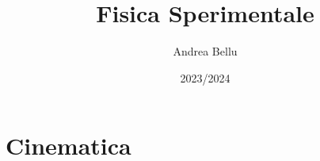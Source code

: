 \documentclass{article}
\title{Fisica Sperimentale}
\author{Andrea Bellu}
\date{2023/2024}
\begin{document}
\maketitle

\tableofcontents
\newpage

\section{Cinematica}

\end{document}
